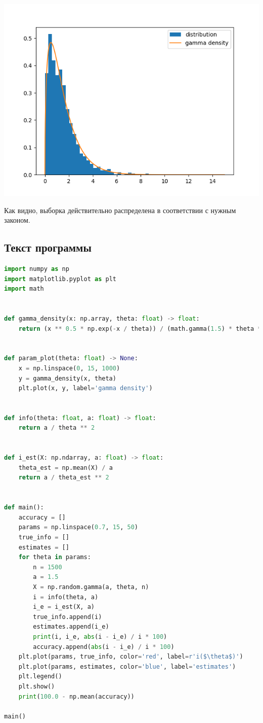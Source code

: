 \documentclass{article}
\begin{document}
\includegraphics[scale=0.5]{gamma.png}

Как видно, выборка действительно распределена в соответствии с нужным законом.


\subsection{Текст программы}

\lstset{style=mystyle}
\begin{lstlisting}[language=Python]
import numpy as np
import matplotlib.pyplot as plt
import math


def gamma_density(x: np.array, theta: float) -> float:
    return (x ** 0.5 * np.exp(-x / theta)) / (math.gamma(1.5) * theta ** 1.5)


def param_plot(theta: float) -> None:
    x = np.linspace(0, 15, 1000)
    y = gamma_density(x, theta)
    plt.plot(x, y, label='gamma density')


def info(theta: float, a: float) -> float:
    return a / theta ** 2


def i_est(X: np.ndarray, a: float) -> float:
    theta_est = np.mean(X) / a
    return a / theta_est ** 2


def main():
    accuracy = []
    params = np.linspace(0.7, 15, 50)
    true_info = []
    estimates = []
    for theta in params:
        n = 1500
        a = 1.5
        X = np.random.gamma(a, theta, n)
        i = info(theta, a)
        i_e = i_est(X, a)
        true_info.append(i)
        estimates.append(i_e)
        print(i, i_e, abs(i - i_e) / i * 100)
        accuracy.append(abs(i - i_e) / i * 100)
    plt.plot(params, true_info, color='red', label=r'i($\theta$)')
    plt.plot(params, estimates, color='blue', label='estimates')
    plt.legend()
    plt.show()
    print(100.0 - np.mean(accuracy))

main()
\end{lstlisting}
\end{document}
